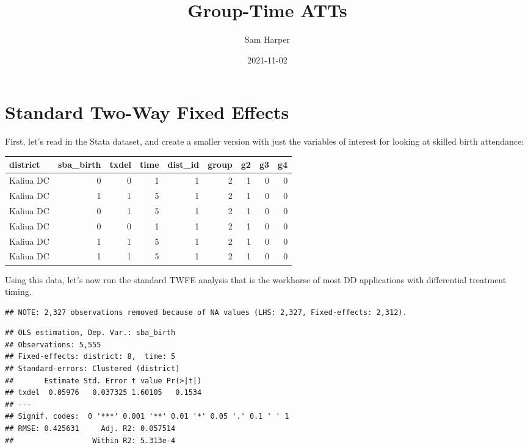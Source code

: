 \documentclass[
]{article}
\title{Group-Time ATTs}
\author{Sam Harper}
\date{2021-11-02}
\begin{document}
\maketitle

\hypertarget{standard-two-way-fixed-effects}{%
\section{Standard Two-Way Fixed
Effects}\label{standard-two-way-fixed-effects}}

First, let's read in the Stata dataset, and create a smaller version
with just the variables of interest for looking at skilled birth
attendance:

\begin{table}
\centering
\begin{tabular}{l|r|r|r|r|r|r|r|r}
\hline
district & sba\_birth & txdel & time & dist\_id & group & g2 & g3 & g4\\
\hline
Kaliua DC & 0 & 0 & 1 & 1 & 2 & 1 & 0 & 0\\
\hline
Kaliua DC & 1 & 1 & 5 & 1 & 2 & 1 & 0 & 0\\
\hline
Kaliua DC & 0 & 1 & 5 & 1 & 2 & 1 & 0 & 0\\
\hline
Kaliua DC & 0 & 0 & 1 & 1 & 2 & 1 & 0 & 0\\
\hline
Kaliua DC & 1 & 1 & 5 & 1 & 2 & 1 & 0 & 0\\
\hline
Kaliua DC & 1 & 1 & 5 & 1 & 2 & 1 & 0 & 0\\
\hline
\end{tabular}
\end{table}

Using this data, let's now run the standard TWFE analysis that is the
workhorse of most DD applications with differential treatment timing.

\begin{verbatim}
## NOTE: 2,327 observations removed because of NA values (LHS: 2,327, Fixed-effects: 2,312).
\end{verbatim}

\begin{verbatim}
## OLS estimation, Dep. Var.: sba_birth
## Observations: 5,555 
## Fixed-effects: district: 8,  time: 5
## Standard-errors: Clustered (district) 
##       Estimate Std. Error t value Pr(>|t|) 
## txdel  0.05976   0.037325 1.60105   0.1534 
## ---
## Signif. codes:  0 '***' 0.001 '**' 0.01 '*' 0.05 '.' 0.1 ' ' 1
## RMSE: 0.425631     Adj. R2: 0.057514
##                  Within R2: 5.313e-4
\end{verbatim}
\end{document}
